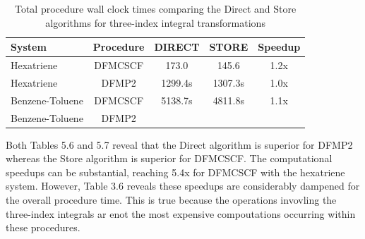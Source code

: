 \begingroup
\begin{table}[H]
\centering
\renewcommand{\baselinestretch}{1}
\caption{Total procedure wall clock times comparing the Direct and Store algorithms for three-index integral transformations}
\begin{tabular}{l cccc}
\multicolumn{1}{l}{\textbf{System}} &
\multicolumn{1}{c}{\textbf{Procedure}} &
\multicolumn{1}{c}{\textbf{DIRECT}} &
\multicolumn{1}{c}{\textbf{STORE}} &
\multicolumn{1}{c}{\textbf{Speedup}} \\ 
\hline
Hexatriene        & DFMCSCF & 173.0   & 145.6   &  1.2x  \\ 
Hexatriene        & DFMP2   & 1299.4s & 1307.3s &  1.0x  \\ 
Benzene-Toluene   & DFMCSCF & 5138.7s & 4811.8s &  1.1x  \\ 
Benzene-Toluene   & DFMP2   &   &   &    \\ 
\end{tabular}
\end{table}
\endgroup

Both Tables 5.6 and 5.7 reveal that the Direct algorithm is superior for DFMP2 whereas the Store algorithm is superior for
DFMCSCF. The computational speedups can be substantial, reaching 5.4x for DFMCSCF with the hexatriene system. However, Table 3.6
reveals these speedups are considerably dampened for the overall procedure time. This is true because 
the operations invovling the three-index integrals ar enot the most expensive compoutations occurring within these procedures.



